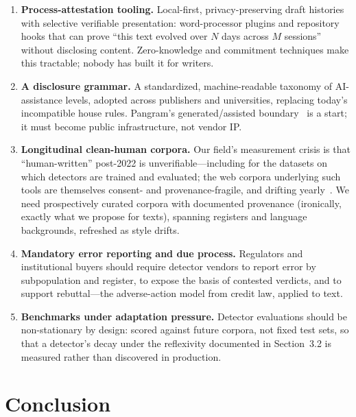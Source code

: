 \documentclass[sigconf,nonacm]{acmart}
\begin{document}
\begin{enumerate}
\item \textbf{Process-attestation tooling.} Local-first, privacy-preserving draft histories with selective verifiable presentation: word-processor plugins and repository hooks that can prove ``this text evolved over \(N\) days across \(M\) sessions'' without disclosing content. Zero-knowledge and commitment techniques make this tractable; nobody has built it for writers.
\item \textbf{A disclosure grammar.} A standardized, machine-readable taxonomy of AI-assistance levels, adopted across publishers and universities, replacing today's incompatible house rules. Pangram's generated/assisted boundary~\cite{r1} is a start; it must become public infrastructure, not vendor IP.
\item \textbf{Longitudinal clean-human corpora.} Our field's measurement crisis is that ``human-written'' post-2022 is unverifiable---including for the datasets on which detectors are trained and evaluated; the web corpora underlying such tools are themselves consent- and provenance-fragile, and drifting yearly~\cite{r20}. We need prospectively curated corpora with documented provenance (ironically, exactly what we propose for texts), spanning registers and language backgrounds, refreshed as style drifts.
\item \textbf{Mandatory error reporting and due process.} Regulators and institutional buyers should require detector vendors to report error by subpopulation and register, to expose the basis of contested verdicts, and to support rebuttal---the adverse-action model from credit law, applied to text.
\item \textbf{Benchmarks under adaptation pressure.} Detector evaluations should be non-stationary by design: scored against future corpora, not fixed test sets, so that a detector's decay under the reflexivity documented in Section~3.2 is measured rather than discovered in production.
\end{enumerate}

\section{Conclusion}
\end{document}
